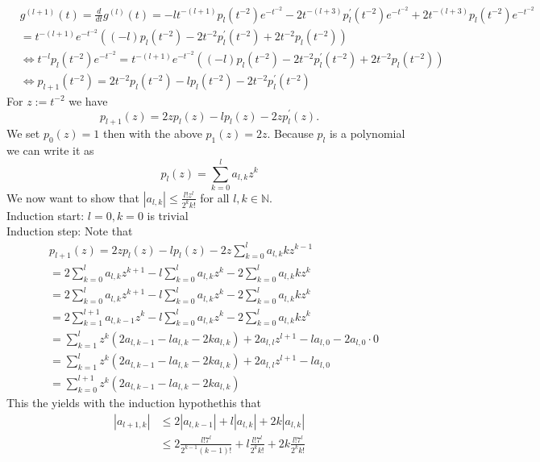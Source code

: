 \documentclass[A4,12pt,twoside]{book}
\begin{document}
{\begin{align*}
       & g^{(l+1)} (t) = \frac{d}{dt} g^{(l)} (t) = - l t^{-(l+1)} p_l (t^{-2}) e^{-t^{-2}} - 2 t^{-(l+3)} p^\prime_l (t^{-2}) e^{-t^{-2}} + 2 t^{-(l+3)} p_l (t^{-2}) e^{-t^{-2}} \\
        &= t^{-(l+1)} e^{-t^{-2}} \left( (-l) p_l (t^{-2}) - 2 t^{-2} p_l^\prime (t^{-2}) + 2 t^{-2} p_l (t^{-2}) \right) \\
        &\iff t^{-l} p_l (t^{-2}) e^{-t^{-2}}=  t^{-(l+1)} e^{-t^{-2}} \left( (-l) p_l (t^{-2}) - 2 t^{-2} p_l^\prime (t^{-2}) + 2 t^{-2} p_l (t^{-2}) \right) \\
        &\iff p_{l+1} (t^{-2})= 2 t^{-2} p_l (t^{-2})  -l p_l (t^{-2}) - 2 t^{-2} p_l^\prime (t^{-2}) 
    \end{align*}
    For $z:= t^{-2}$ we have 
    \[
     p_{l+1} (z)= 2 z p_l (z)  -l p_l (z) - 2 z p_l^\prime (z) .
    \]
    We set $p_0(z)=1$ then with the above $p_1(z) = 2z$. Because $p_l$ is a polynomial we can write it as 
    \[
    p_l (z) = \sum_{k=0}^l a_{l,k} z^k 
    \]
    We now want to show that $|a_{l,k}| \leq \frac{l! z^l}{2^k k!}$ for all $l,k \in \mathbb{N}$. \\
    Induction start: $l=0,k=0$ is trivial\\
    Induction step: Note that 
    \begin{align*}
        &p_{l+1} (z) = 2 z p_l (z)  -l p_l (z) - 2 z \sum_{k=0}^{l} a_{l,k} k z^{k-1}  \\
        &=2  \sum_{k=0}^l a_{l,k} z^{k+1}   -l \sum_{k=0}^l a_{l,k} z^k  - 2  \sum_{k=0}^{l} a_{l,k} k z^{k} \\
        &=2  \sum_{k=0}^l a_{l,k} z^{k+1}   -l \sum_{k=0}^l a_{l,k} z^k  - 2  \sum_{k=0}^{l} a_{l,k} k z^{k} \\
        &=2  \sum_{k=1}^{l+1} a_{l,k-1} z^{k}   -l \sum_{k=0}^l a_{l,k} z^k  - 2  \sum_{k=0}^{l} a_{l,k} k z^{k} \\
        &= \sum_{k=1}^l z^k (2 a_{l,k-1} -la_{l,k} - 2ka_{l,k})  + 2 a_{l,l} z^{l+1} - l a_{l,0} - 2 a_{l,0} \cdot 0 \\
        &= \sum_{k=1}^l z^k (2 a_{l,k-1} -la_{l,k} - 2ka_{l,k})  + 2 a_{l,l} z^{l+1} - l a_{l,0} \\
        &= \sum_{k=0}^{l+1} z^k (2 a_{l,k-1} -la_{l,k} - 2ka_{l,k})
    \end{align*}
    This the yields with the induction hypothethis that 
    \begin{align*}
        |a_{l+1,k}| &\leq 2 |a_{l,k-1}| + l |a_{l,k}| + 2k|a_{l,k}| \\
        & \leq 2 \frac{l! 7^l}{2^{k-1} (k-1)!} + l \frac{l! 7^l}{2^{k} k!} + 2 k \frac{l! 7^l}{2^{k} k!} \\

\end{align*}}
\end{document}
